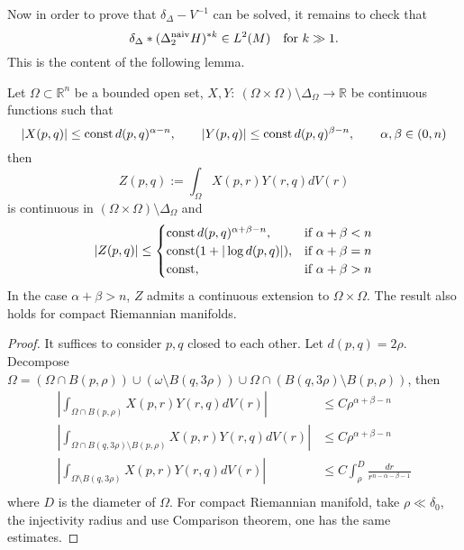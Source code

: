 Now in order to prove that \(\delta_\Delta - V^{-1}\) can be solved, it remains to check that
\begin{equation}
\label{eq:convo-k}
 \delta_\Delta * (\Delta_2^{\rm naiv} H)^{*k} \in L^2(M)\quad \text{for \( k \gg 1 \)}.
\end{equation}
This is the content of the following lemma.

\begin{lemma}
\label{lem:reg-conv}
Let \(\Omega\subset \mathbb{R}^n\) be a bounded open set,
\(X,Y:\ (\Omega\times\Omega)\setminus\Delta_\Omega \longrightarrow \mathbb{R}\) be
continuous functions such that
\[ 
\left| X(p,q) \right| \leq \mathop{\rm const }\nolimits d(p,q)^{\alpha-n},\qquad \left| Y(p,q) \right|\leq
\mathop{\rm const }\nolimits d(p,q)^{\beta-n}, \qquad  \alpha,\beta \in (0,n) 
\]
then
\[
 Z(p,q):=\int_\Omega X(p,r)Y(r,q) dV(r)
\]
is continuous in \((\Omega\times\Omega)\setminus\Delta_\Omega\) and
\[
\left| Z(p,q) \right| \leq \begin{cases}
\mathop{\rm const }\nolimits d(p,q)^{\alpha +\beta -n}   ,  & \text{if \(\alpha +\beta < n\)} \\
\mathop{\rm const }\nolimits (1 + |\log d(p,q) |)	   , & \text{if \(\alpha +\beta = n\)} \\
\mathop{\rm const }\nolimits	   , & \text{if \(\alpha +\beta > n\)}
\end{cases}
\]
In the case \(\alpha +\beta >n\), \(Z\) admits a continuous extension to \(\Omega\times\Omega\).
The result also holds for compact Riemannian manifolds.
\end{lemma}

\begin{proof}
It suffices to consider \(p,q\) closed to each other. Let \(d(p,q) = 2\rho\). Decompose \(\Omega = (\Omega\cap B(p, \rho))\cup (\omega \setminus B(q, 3\rho)) \cup
\Omega\cap (B(q, 3\rho)\setminus B(p,\rho))\), then
\begin{equation*}
\begin{split}
\left| \int_{\Omega\cap B(p,\rho)}X(p,r)Y(r,q) dV(r) \right| &\leq C\rho^{\alpha + \beta -n}\\
\left| \int_{\Omega\cap B(q,3\rho)\setminus B(p, \rho)} X(p,r)Y(r,q) dV(r) \right| &\leq C\rho^{\alpha + \beta -n}\\
\left| \int_{\Omega\setminus B(q,3\rho)}X(p,r)Y(r,q) dV(r) \right| &\leq C\int_\rho^D \frac{dr}{r^{n-\alpha -\beta - 1}}\\
\end{split}   
\end{equation*}
where \(D\) is the diameter of \(\Omega\). For compact Riemannian manifold, take \(\rho \ll \delta_0\), the injectivity radius and use Comparison theorem, one has the same estimates.
\end{proof}

